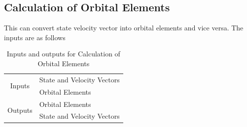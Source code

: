 \subsection{Calculation of Orbital Elements}
This can convert state velocity vector into orbital elements and vice versa. The inputs are as follows
\begin{table}[H]
\centering
\begin{tabular}{@{}cl@{}}
\toprule
\multirow{2}{*}{Inputs} & State and Velocity Vectors            \\ \cmidrule(l){2-2} 
                                 & \multicolumn{1}{l}{Orbital Elements} \\ \midrule
\multicolumn{1}{r}{\multirow{2}{*}{Outputs}} & \multicolumn{1}{l}{Orbital Elements} \\ \cmidrule(l){2-2} 
\multicolumn{1}{r}{}           & State and Velocity Vectors            \\ \bottomrule
\end{tabular}\caption{Inputs and outputs for Calculation of Orbital Elements}
\end{table}
\begin{figure}[H]
\begin{floatrow}
\end{floatrow}
\end{figure}

